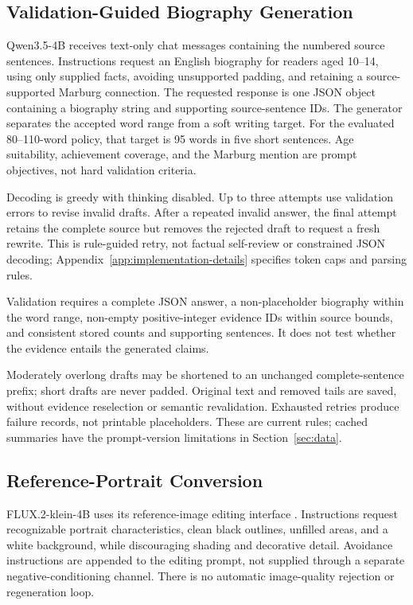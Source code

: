 \documentclass[11pt]{article}
\begin{document}
\subsection{Validation-Guided Biography Generation}

Qwen3.5-4B receives text-only chat messages containing the numbered source sentences. Instructions request an English biography for readers aged 10--14, using only supplied facts, avoiding unsupported padding, and retaining a source-supported Marburg connection. The requested response is one JSON object containing a biography string and supporting source-sentence IDs. The generator separates the accepted word range from a soft writing target. For the evaluated 80--110-word policy, that target is 95 words in five short sentences. Age suitability, achievement coverage, and the Marburg mention are prompt objectives, not hard validation criteria.

Decoding is greedy with thinking disabled. Up to three attempts use validation errors to revise invalid drafts. After a repeated invalid answer, the final attempt retains the complete source but removes the rejected draft to request a fresh rewrite. This is rule-guided retry, not factual self-review or constrained JSON decoding; Appendix~\ref{app:implementation-details} specifies token caps and parsing rules.

Validation requires a complete JSON answer, a non-placeholder biography within the word range, non-empty positive-integer evidence IDs within source bounds, and consistent stored counts and supporting sentences. It does not test whether the evidence entails the generated claims.

Moderately overlong drafts may be shortened to an unchanged complete-sentence prefix; short drafts are never padded. Original text and removed tails are saved, without evidence reselection or semantic revalidation. Exhausted retries produce failure records, not printable placeholders. These are current rules; cached summaries have the prompt-version limitations in Section~\ref{sec:data}.

\subsection{Reference-Portrait Conversion}

FLUX.2-klein-4B uses its reference-image editing interface \citep{flux2-klein-4b-model-card}. Instructions request recognizable portrait characteristics, clean black outlines, unfilled areas, and a white background, while discouraging shading and decorative detail. Avoidance instructions are appended to the editing prompt, not supplied through a separate negative-conditioning channel. There is no automatic image-quality rejection or regeneration loop.
\end{document}
